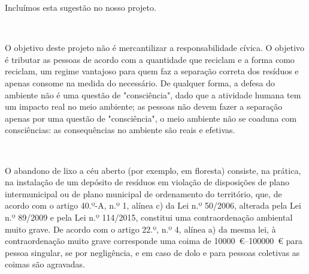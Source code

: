\documentclass[11pt, a4paper, oneside]{book}
\begin{document}
\begin{appendices}
Incluímos esta sugestão no nosso projeto.

~

\noindent{}

O objetivo deste projeto não é mercantilizar a responsabilidade cívica. O objetivo é tributar as pessoas de acordo com a quantidade que reciclam e a forma como reciclam, um regime vantajoso para quem faz a separação correta dos resíduos e apenas consome na medida do necessário. De qualquer forma, a defesa do ambiente não é uma questão de "consciência", dado que a atividade humana tem um impacto real no meio ambiente; as pessoas não devem fazer a separação apenas por uma questão de "consciência", o meio ambiente não se coaduna com consciências: as consequências no ambiente são reais e efetivas.

~

\noindent{}

O abandono de lixo a céu aberto (por exemplo, em floresta) consiste, na prática, na instalação de um depósito de resíduos em violação de disposições de plano intermunicipal ou de plano municipal de ordenamento do território, que, de acordo com o artigo 40.º-A, n.º 1, alínea c) da Lei n.º 50/2006, alterada pela Lei n.º 89/2009 e pela Lei n.º 114/2015, constitui uma contraordenação ambiental muito grave. De acordo com o artigo 22.º, n.º 4, alínea a) da mesma lei, à contraordenação muito grave corresponde uma coima de \SIrange{10000}{100000}{\euro} para pessoa singular, se por negligência, e em caso de dolo e para pessoas coletivas as coimas são agravadas.

~


\end{appendices}
\end{document}
